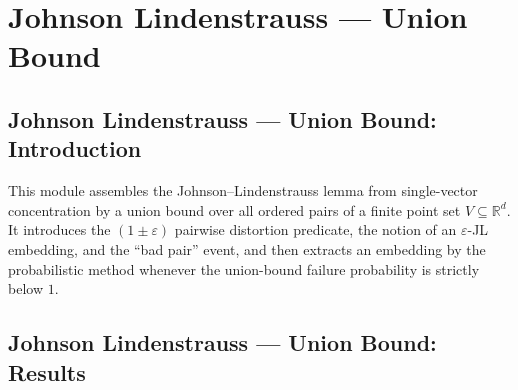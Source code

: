 \section{Johnson Lindenstrauss --- Union Bound}
\subsection*{Johnson Lindenstrauss --- Union Bound: Introduction}

This module assembles the Johnson--Lindenstrauss lemma from single-vector
concentration by a union bound over all ordered pairs of a finite point set
$V \subseteq \mathbb{R}^d$.  It introduces the $(1\pm\varepsilon)$ pairwise
distortion predicate, the notion of an $\varepsilon$-JL embedding, and the
``bad pair'' event, and then extracts an embedding by the probabilistic method
whenever the union-bound failure probability is strictly below $1$.

\subsection*{Johnson Lindenstrauss --- Union Bound: Results}

